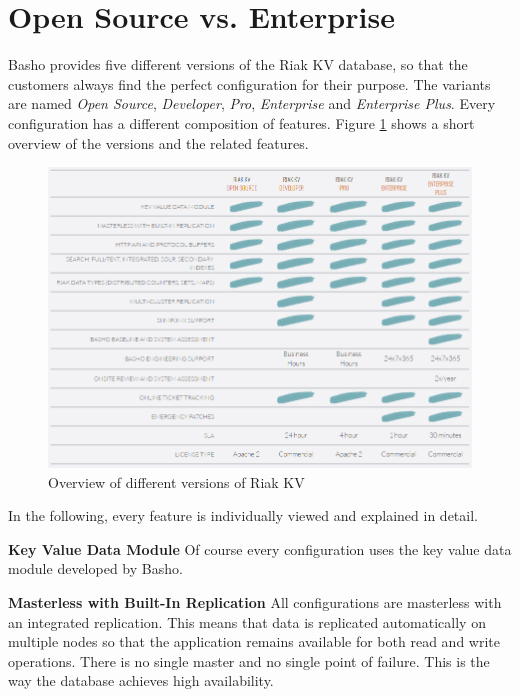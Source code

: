 \section{Open Source vs. Enterprise}

Basho provides five different versions of the Riak KV database, so that the customers always find the perfect configuration for their purpose. The variants are named \textit{Open Source}, \textit{Developer}, \textit{Pro}, \textit{Enterprise} and \textit{Enterprise Plus}. Every configuration has a different composition of features. Figure \ref{fig:overview} shows a short overview of the versions and the related features.

\begin{figure}[ht]
	\centering
	\includegraphics[width=\textwidth]{images/opensource_vs_commercial.png}
	\caption[Overview of different versions of Riak KV \protect\cite{Basho.01.04.2017}]{Overview of different versions of Riak KV \protect\cite{Basho.01.04.2017}}
	\label{fig:overview}
\end{figure}

In the following, every feature is individually viewed and explained in detail.

\newpage

\textbf{Key Value Data Module}\newline
Of course every configuration uses the key value data module developed by Basho.

\textbf{Masterless with Built-In Replication}\newline
All configurations are masterless with an integrated replication. This means that data is replicated automatically on multiple nodes so that the application remains available for both read and write operations. There is no single master and no single point of failure. This is the way the database achieves high availability. \cite{Basho.01.04.2017}

